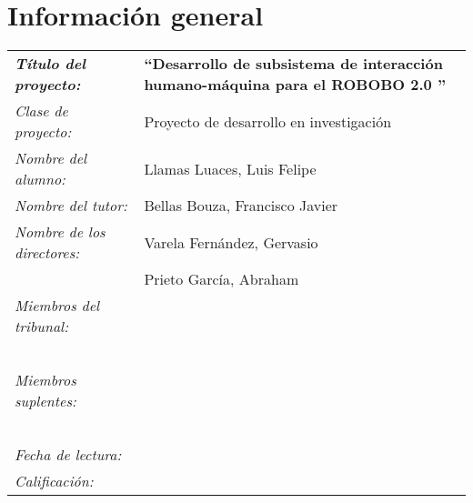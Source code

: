 \thispagestyle{empty}
\section*{Información general}
\vfill
\begin{center}
\begin{tabular}{p{4.5cm}p{9cm}}
\textbf{\emph{Título del proyecto:}} & \textbf{``Desarrollo de subsistema de interacción humano-máquina para el ROBOBO 2.0
''} \\[0.5cm]
\emph{Clase de proyecto:} & Proyecto de desarrollo en investigación \\[0.5cm]
\emph{Nombre del alumno:} & Llamas Luaces, Luis Felipe \\[0.5cm]
\emph{Nombre del tutor:} & Bellas Bouza, Francisco Javier \\[0.5cm]
\emph{Nombre de los directores:} & Varela Fernández, Gervasio \\ & Prieto García, Abraham \\[0.5cm]
\emph{Miembros del tribunal:} & \\[0.5cm]
& \\
& \\
& \\
& \\
& \\
\emph{Miembros suplentes:} & \\[0.5cm]
& \\
& \\
& \\
& \\
& \\
\emph{Fecha de lectura:} & \\[0.5cm]
\emph{Calificación:} & \\
\end{tabular}
\end{center}
\vfill
